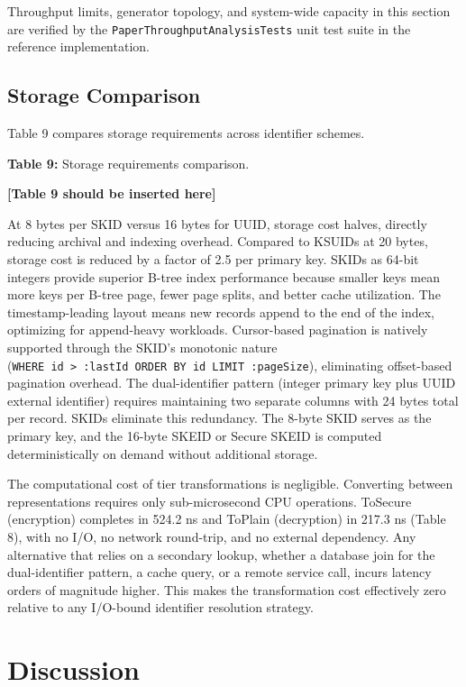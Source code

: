 \documentclass[fleqn,10pt,lineno]{wlpeerj}
\begin{document}
Throughput limits, generator topology, and system-wide capacity in this
section are verified by the \texttt{PaperThroughputAnalysisTests} unit
test suite in the reference implementation.

\subsection{Storage Comparison}\label{storage-comparison}

Table 9 compares storage requirements across identifier schemes.

\textbf{Table 9:} Storage requirements comparison.

\textbf{{[}Table 9 should be inserted here{]}}

At 8 bytes per SKID versus 16 bytes for UUID, storage cost halves,
directly reducing archival and indexing overhead. Compared to KSUIDs at
20 bytes, storage cost is reduced by a factor of 2.5 per primary key.
SKIDs as 64-bit integers provide superior B-tree index performance
because smaller keys mean more keys per B-tree page, fewer page splits,
and better cache utilization. The timestamp-leading layout means new
records append to the end of the index, optimizing for append-heavy
workloads. Cursor-based pagination is natively supported through the
SKID's monotonic nature
(\texttt{WHERE\ id\ \textgreater{}\ :lastId\ ORDER\ BY\ id\ LIMIT\ :pageSize}),
eliminating offset-based pagination overhead. The dual-identifier
pattern (integer primary key plus UUID external identifier) requires
maintaining two separate columns with 24 bytes total per record. SKIDs
eliminate this redundancy. The 8-byte SKID serves as the primary key,
and the 16-byte SKEID or Secure SKEID is computed deterministically on
demand without additional storage.

The computational cost of tier transformations is negligible. Converting
between representations requires only sub-microsecond CPU operations.
ToSecure (encryption) completes in 524.2 ns and ToPlain (decryption) in
217.3 ns (Table 8), with no I/O, no network round-trip, and no external
dependency. Any alternative that relies on a secondary lookup, whether a
database join for the dual-identifier pattern, a cache query, or a
remote service call, incurs latency orders of magnitude higher. This
makes the transformation cost effectively zero relative to any I/O-bound
identifier resolution strategy.

\section{Discussion}\label{discussion}
\end{document}
